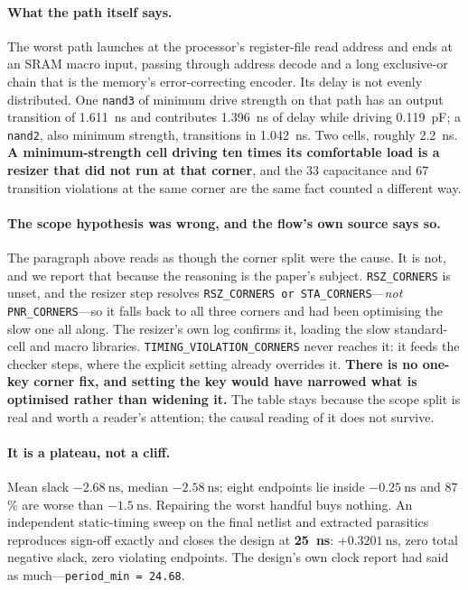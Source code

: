 \documentclass[11pt,a4paper]{article}
\newcommand{\file}[1]{\texttt{\small #1}}
\begin{document}
\paragraph{What the path itself says.}
The worst path launches at the processor's register-file read address and
ends at an SRAM macro input, passing through address decode and a long
exclusive-or chain that is the memory's error-correcting encoder. Its
delay is not evenly distributed. One \texttt{nand3} of minimum drive
strength on that path has an output transition of
\SI{1.611}{\nano\second} and contributes \SI{1.396}{\nano\second} of
delay while driving \SI{0.119}{\pico\farad}; a \texttt{nand2}, also
minimum strength, transitions in \SI{1.042}{\nano\second}. Two cells,
roughly \SI{2.2}{\nano\second}. \textbf{A minimum-strength cell driving
ten times its comfortable load is a resizer that did not run at that
corner}, and the 33 capacitance and 67 transition violations at the same
corner are the same fact counted a different way.

\paragraph{The scope hypothesis was wrong, and the flow's own source
says so.}
The paragraph above reads as though the corner split were the cause. It
is not, and we report that because the reasoning is the paper's subject.
\file{RSZ\_CORNERS} is unset, and the resizer step resolves
\texttt{RSZ\_CORNERS or STA\_CORNERS}---\emph{not}
\texttt{PNR\_CORNERS}---so it falls back to all three corners and had
been optimising the slow one all along. The resizer's own log confirms
it, loading the slow standard-cell and macro libraries.
\texttt{TIMING\_VIOLATION\_CORNERS} never reaches it: it feeds the
checker steps, where the explicit setting already overrides it.
\textbf{There is no one-key corner fix, and setting the key would have
narrowed what is optimised rather than widening it.} The table stays
because the scope split is real and worth a reader's attention; the
causal reading of it does not survive.

\paragraph{It is a plateau, not a cliff.}
Mean slack $-\SI{2.68}{\nano\second}$, median $-\SI{2.58}{\nano\second}$;
eight endpoints lie inside $-\SI{0.25}{\nano\second}$ and 87\,\% are
worse than $-\SI{1.5}{\nano\second}$. Repairing the worst handful buys
nothing. An independent static-timing sweep on the final netlist and
extracted parasitics reproduces sign-off exactly and closes the design
at \textbf{\SI{25}{\nano\second}}: $+\SI{0.3201}{\nano\second}$, zero
total negative slack, zero violating endpoints. The design's own clock
report had said as much---\texttt{period\_min = 24.68}.
\end{document}
